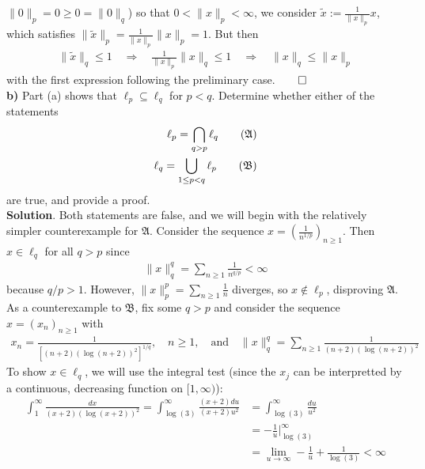 \documentclass[10pt]{article}
\newcommand{\1}[1]{\mathbbm{1}_{#1}}
\begin{document}
    $\|0\|_p=0\geq 0=\|0\|_q$) so that $0<\|x\|_p<\infty$, we consider
    $\tilde{x}:=\tfrac{1}{\|x\|_p}x$, which satisfies
    $\|\tilde{x}\|_p=\tfrac{1}{\|x\|_p}\|x\|_p=1$. But then
    \begin{align*}
        \|\tilde{x}\|_q\leq 1\quad\Rightarrow\quad\frac{1}{\|x\|_p}\|x\|_q\leq 1\quad\Rightarrow\quad \|x\|_q\leq\|x\|_p
    \end{align*}
    with the first expression following the preliminary
    case.\hfill{$\qed$}\\[5pt]
    {\bf b)} Part (a) shows that $\ell_p\subseteq\ell_q$ for $p<q$. Determine
    whether either of the statements
    \begin{align*}
        \ell_p=\bigcap_{q>p}\ell_q\tag{$\mathfrak{A}$}\\
        \ell_q=\bigcup_{1\leq p<q}\ell_p\tag{$\mathfrak{B}$}
    \end{align*}
    are true, and provide a proof.\\[5pt]
    {\bf Solution}. Both statements are false, and we will begin with the
    relatively simpler counterexample for $\mathfrak{A}$. Consider the sequence
    $x=(\tfrac{1}{n^{1/p}})_{n\geq 1}$. Then $x\in\ell_q$ for all $q>p$ since
    \begin{align*}
        \|x\|_q^q=\sum_{n\geq 1}\frac{1}{n^{q/p}}<\infty
    \end{align*}
    because $q/p>1$. However, $\|x\|^p_p=\sum_{n\geq 1}\tfrac{1}{n}$ diverges,
    so $x\notin\ell_p$, disproving $\mathfrak{A}$.\\[5pt]
    As a counterexample to $\mathfrak{B}$, fix some $q>p$ and consider the
    sequence $x=(x_n)_{n\geq 1}$ with
    \begin{align*}
        x_n=\frac{1}{[(n+2)(\log(n+2))^2]^{1/q}},\quad n\geq 1,\quad\text{and}\quad\|x\|_q^q=\sum_{n\geq 1}\frac{1}{(n+2)(\log(n+2))^2}
    \end{align*}
    To show $x\in\ell_q$, we will use the integral test (since the $x_j$ can be
    interpretted by a continuous, decreasing function on $[1,\infty)$):
    \begin{align*}
        \int_1^\infty\frac{dx}{(x+2)(\log(x+2))^2}=\int_{\log(3)}^\infty\frac{(x+2)du}{(x+2)u^2}&=\int_{\log(3)}^\infty\frac{du}{u^2}\tag{change of variables $u=\log(x+2)$}\\
        &=-\frac{1}{u}\bigg|^\infty_{\log(3)}\\
        &=\lim_{u\rightarrow\infty}-\frac{1}{u}+\frac{1}{\log(3)}<\infty
    \end{align*}
\end{document}
